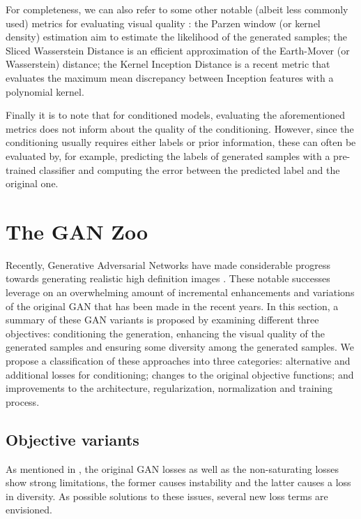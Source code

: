 For completeness, we can also refer to some other notable (albeit less commonly used) metrics for evaluating visual quality  \citep{Borji2018}: the Parzen window (or kernel density) estimation \citep{Parzen1962} aim to estimate the likelihood of the generated samples; the Sliced Wasserstein Distance \citep{Julien2011} is an efficient approximation of the Earth-Mover (or Wasserstein) distance; the  Kernel Inception Distance \citep{Binkowski2018} is a recent metric that evaluates the maximum mean discrepancy between Inception features with a polynomial kernel.

Finally it is to note that for conditioned models, evaluating the aforementioned metrics does not inform about the quality of the conditioning. However, since the conditioning usually requires either labels or prior information, these can often be evaluated by, for example, predicting the labels of generated samples with a pre-trained classifier and computing the error between the predicted label and the original one.


\section{The GAN Zoo}

Recently, Generative Adversarial Networks have made considerable progress towards generating realistic high definition images \citep{Brock2018, Karras2020, Wang2018b}. These notable successes leverage on an overwhelming amount of incremental enhancements and variations of the original GAN \citep{Hindupur2017} that has been made in the recent years. In this section, a summary of these GAN variants is proposed by examining different three objectives: conditioning the generation, enhancing the visual quality of the generated samples and ensuring some diversity among the generated samples. We propose a classification of these approaches into three categories: alternative and additional losses for conditioning;  changes to the original objective functions; and improvements to the  architecture, regularization, normalization and training process.


\subsection{Objective variants}

As mentioned in , the original GAN losses as well as the non-saturating losses show strong limitations, the former causes instability and the latter causes a loss in diversity. As possible solutions to these issues, several new loss terms are envisioned.

